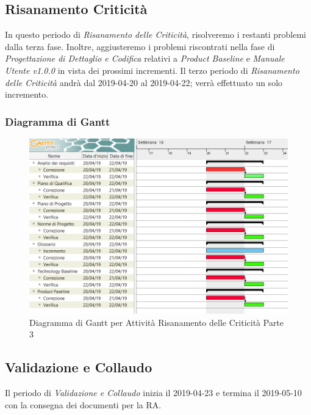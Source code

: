 \subsection{Risanamento Criticità}
\label{RC3}
In questo periodo di \textit{Risanamento delle Criticità}, risolveremo i restanti problemi dalla terza fase. Inoltre, aggiusteremo i problemi riscontrati nella fase di \textit{Progettazione di Dettaglio e Codifica} relativi a \textit{Product Baseline} e \textit{Manuale Utente v1.0.0} in vista dei prossimi incrementi.
Il terzo periodo di \textit{Risanamento delle Criticità} andrà dal 2019-04-20 al 2019-04-22; verrà effettuato un solo incremento.

\subsubsection{Diagramma di Gantt}
\begin{figure}[h]
	\centering
  		\includegraphics[width=1.0\linewidth]{./images/RisanamentoCriticita3.png}
  		\caption{Diagramma di Gantt per Attività Risanamento delle Criticità Parte 3}
  		\label{fig:Gantt Risananmento Criticità 3}
\end{figure}

\newpage
\subsection{Validazione e Collaudo}
\label{VEC}
Il periodo di \textit{Validazione e Collaudo} inizia il 2019-04-23 e termina il 2019-05-10 con la consegna dei documenti per la RA. 


